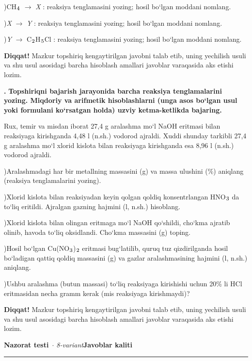\documentclass[11pt,a4paper]{article}
\renewcommand{\textsubscript}[1]{\ensuremath{_{\text{\fontsize{8}{8}\selectfont #1}}}}
\newcommand{\qn}[1]{\textbf{\fontsize{11.5}{13}\selectfont #1}}
\newcommand{\qsep}{\par\vspace{1pt}\noindent\rule{0pt}{0.4pt}\par\vspace{5pt}}
\newcommand{\diqqat}[1]{\par\smallskip\noindent\textbf{Diqqat!} #1\par\medskip}
\begin{document}
)CH\textsubscript{4} $\to$ \textit{X} : reaksiya tenglamasini yozing; hosil bo`lgan moddani nomlang.\par
{})\textit{X} $\to$ \textit{Y} : reaksiya tenglamasini yozing; hosil bo`lgan moddani nomlang.\par
{})\textit{Y} $\to$ C\textsubscript{2}H\textsubscript{5}Cl : reaksiya tenglamasini yozing; hosil bo`lgan moddani nomlang.\par
\diqqat{Mazkur topshiriq kengaytirilgan javobni talab etib, uning yechilish usuli va shu usul asosidagi barcha hisoblash amallari javoblar varaqasida aks etishi lozim.}\qsep
\noindent\qn{43.} \textbf{Topshiriqni bajarish jarayonida barcha reaksiya tenglamalarini yozing. Miqdoriy va arifmetik hisoblashlarni (unga asos bo`lgan usul yoki formulani ko`rsatgan holda) uzviy ketma-ketlikda bajaring.}\par\smallskip
Rux, temir va misdan iborat 27,4 g aralashma mo`l NaOH eritmasi bilan reaksiyaga kirishganda 4,48 l (n.sh.) vodorod ajraldi. Xuddi shunday tarkibli 27,4 g aralashma mo`l xlorid kislota bilan reaksiyaga kirishganda esa 8,96 l (n.sh.) vodorod ajraldi.\par
{})Aralashmadagi har bir metallning massasini (g) va massa ulushini (\%) aniqlang (reaksiya tenglamalarini yozing).\par
{})Xlorid kislota bilan reaksiyadan keyin qolgan qoldiq konsentrlangan HNO\textsubscript{3} da to`liq eritildi. Ajralgan gazning hajmini (l, n.sh.) hisoblang.\par
{})Xlorid kislota bilan olingan eritmaga mo`l NaOH qo`shildi, cho`kma ajratib olinib, havoda to`liq oksidlandi. Cho`kma massasini (g) toping.\par
{})Hosil bo`lgan Cu(NO\textsubscript{3})\textsubscript{2} eritmasi bug`latilib, quruq tuz qizdirilganda hosil bo`ladigan qattiq qoldiq massasini (g) va gazlar aralashmasining hajmini (l, n.sh.) aniqlang.\par
{})Ushbu aralashma (butun massasi) to`liq reaksiyaga kirishishi uchun 20\% li HCl eritmasidan necha gramm kerak (mis reaksiyaga kirishmaydi)?\par
\diqqat{Mazkur topshiriq kengaytirilgan javobni talab etib, uning yechilish usuli va shu usul asosidagi barcha hisoblash amallari javoblar varaqasida aks etishi lozim.}\qsep
\newpage
\noindent\textbf{\fontsize{13}{15}\selectfont Nazorat testi}\ \textit{$\cdot$ 8-variant}\hfill \textbf{Javoblar kaliti}\par\smallskip\hrule\smallskip
\end{document}
